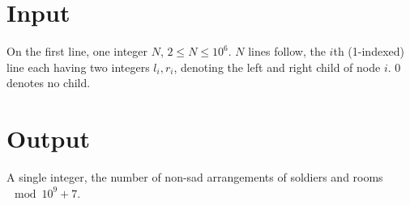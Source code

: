 \section*{Input}
On the first line, one integer $N$, $2 \leq N \leq 10^6$.
$N$ lines follow, the $i$th (1-indexed) line each having two integers $l_i, r_i$, denoting the left and right child of node $i$. $0$ denotes no child.

\section*{Output}
A single integer, the number of non-sad arrangements of soldiers and rooms $\mod 10^9 + 7$.
